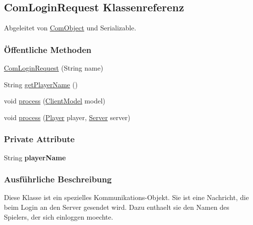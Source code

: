 \hypertarget{a00036}{\subsection{Com\-Login\-Request Klassenreferenz}
\label{a00036}
}


Abgeleitet von \hyperlink{a00037}{Com\-Object} und Serializable.

\subsubsection*{Öffentliche Methoden}
\begin{DoxyCompactItemize}
\item 
\hyperlink{a00036_a1247e09d6e0b4d346008f419a1d1c5cd}{Com\-Login\-Request} (String name)
\item 
String \hyperlink{a00036_a8cd2886758be9855ae14404540d4873d}{get\-Player\-Name} ()
\item 
void \hyperlink{a00036_a758d7005755a181717f238f714d87dd2}{process} (\hyperlink{a00003}{Client\-Model} model)
\item 
void \hyperlink{a00036_ac67b5ce3ec03d48ef1e6caad6e49c902}{process} (\hyperlink{a00076}{Player} player, \hyperlink{a00077}{Server} server)
\end{DoxyCompactItemize}
\subsubsection*{Private Attribute}
\begin{DoxyCompactItemize}
\item 
\hypertarget{a00036_a12adf3f64463f614eb3af6dd82414e0a}{String {\bfseries player\-Name}}\label{a00036_a12adf3f64463f614eb3af6dd82414e0a}

\end{DoxyCompactItemize}


\subsubsection{Ausführliche Beschreibung}
Diese Klasse ist ein spezielles Kommunikations-\/\-Objekt. Sie ist eine Nachricht, die beim Login an den Server gesendet wird. Dazu enthaelt sie den Namen des Spielers, der sich einloggen moechte. 

